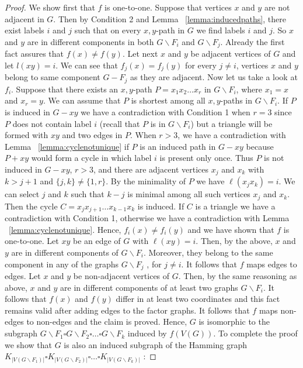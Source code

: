 \documentclass[12pt,a4paper,titlepage,openany]{report}
\begin{document}
\begin{proof}
We show first that $f$ is one-to-one. Suppose that vertices $x$ and $y$ are not adjacent in $G$. Then by Condition 2 and Lemma ~\ref{lemma:inducedpaths}, there exist labels $i$ and $j$ such that on every $x, y$-path in $G$ we find labels $i$ and $j$. So $x$ and $y$ are in different components in both $G\backslash F_i$ and $G\backslash F_j$. Already the first fact assures that $f(x)\neq f(y)$. Let next $x$ and $y$ be adjacent vertices of $G$ and let $l(xy)=i$. We can see that $f_j(x)=f_j(y)$ for every $j\neq i$, vertices $x$ and $y$ belong to same component $G-F_j$ as they are adjacent. Now let us take a look at $f_i$. Suppose that there exists an $x, y$-path $P=x_1x_2\ldots x_r$ in $G\backslash F_i$, where $x_1=x$ and $x_r=y$. We can assume that $P$ is shortest among all $x, y$-paths in $G\backslash F_i$. If $P$ is induced in $G-xy$ we have a contradiction with Condition 1 when $r=3$ since $P$ does not contain label $i$ (recall that $P$ is in $G\backslash F_i$) but a triangle will be formed with $xy$ and two edges in $P$. When $r>3$, we have a contradiction with Lemma ~\ref{lemma:cyclenotunique} if $P$ is an induced path in $G-xy$ because $P+xy$ would form a cycle in which label $i$  is present only once. Thus $P$ is not induced in $G-xy$,
$r > 3$, and there are adjacent vertices $x_j$ and $x_k$ with $k > j+1$ and $\{j,k\}\neq \{1,r\}$. By the minimality of $P$ we have $\ell(x_jx_k)=i$. We can select $j$ and $k$ such that $k- j$ is minimal among all such vertices $x_j$ and $x_k$. Then the cycle $C=x_jx_{j+1}\ldots x_{k-1}x_k$ is induced. If $C$ is a triangle we have a contradiction with Condition 1, otherwise we have a
contradiction with Lemma ~\ref{lemma:cyclenotunique}. Hence, $f_i(x)\neq f_i(y)$ and we have shown that $f$ is one-to-one.\newline
Let $xy$ be an edge of $G$ with $\ell(xy)=i$. Then, by the above, $x$ and $y$ are in different components of $G\backslash F_i$. Moreover, they belong to the same component in any of the graphs $G\backslash F_j$ , for $j\neq i$. It follows that $f$ maps edges to edges.\newline
Let $x$ and $y$ be non-adjacent vertices of $G$. Then, by the same reasoning as above, $x$ and $y$ are in different components of at least two graphs $G\backslash F_i$. It follows that $f(x)$ and $f(y)$ differ in at least two coordinates and this fact remains valid after adding edges to the factor graphs. It follows that $f$ maps non-edges to non-edges and the claim is proved.\newline
Hence, $G$ is isomorphic to the subgraph $G\backslash F_1\square G\backslash F_2\square \ldots \square G\backslash F_k$ induced by $f(V(G))$. To complete the proof we show that $G$ is also an induced subgraph of the Hamming graph $K_{|V(G\backslash F_1)|}\square K_{|V(G\backslash F_2)|}\square \ldots \square K_{|V(G\backslash F_k)|}$ : 
\end{proof}
\end{document}
